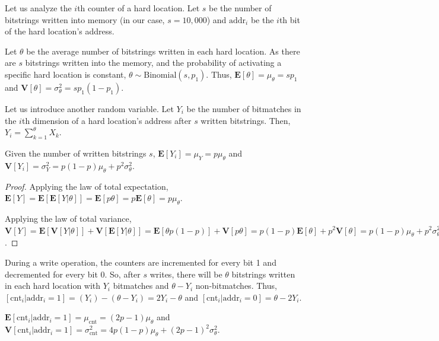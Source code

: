 Let us analyze the $i$th counter of a hard location.  Let $s$ be the number of bitstrings written into memory (in our case, $s=10,000$) and $\text{addr}_i$ be the $i$th bit of the hard location's address.

Let $\theta$ be the average number of bitstrings written in each hard location. As there are $s$ bitstrings written into the memory, and the probability of activating a specific hard location is constant, $\theta \sim \text{Binomial}(s, p_1)$. Thus, $\mathbf{E}[\theta] = \mu_\theta = s p_1$ and $\mathbf{V}[\theta] = \sigma^2_\theta = s p_1 (1 - p_1)$.

Let us introduce another random variable.  Let $Y_i$ be the number of bitmatches in the $i$th dimension of a hard location's address after $s$ written bitstrings. Then, $Y_i = \sum_{k=1}^{\theta} X_k$.

\begin{theorem}
Given the number of written bitstrings $s$, $\mathbf{E}[Y_i] = \mu_Y = p \mu_\theta$ and $\mathbf{V}[Y_i] = \sigma^2_Y = p(1-p) \mu_\theta + p^2 \sigma^2_\theta$.
\end{theorem}
\begin{proof}
Applying the law of total expectation, $\mathbf{E}[Y] = \mathbf{E}[\mathbf{E}[Y|\theta]] = \mathbf{E}[p \theta] = p \mathbf{E}[\theta] = p \mu_\theta$.

Applying the law of total variance, \\
$\mathbf{V}[Y] = \mathbf{E}[\mathbf{V}[Y|\theta]] + \mathbf{V}[\mathbf{E}[Y|\theta]] = \mathbf{E}[\theta p (1-p)] + \mathbf{V}[p \theta] = p(1-p) \mathbf{E}[\theta] + p^2 \mathbf{V}[\theta] = p(1-p) \mu_\theta + p^2 \sigma^2_\theta$.
\end{proof}

During a write operation, the counters are incremented for every bit 1 and decremented for every bit 0. So, after $s$ writes, there will be $\theta$ bitstrings written in each hard location with $Y_i$ bitmatches and $\theta - Y_i$ non-bitmatches. Thus, $[\text{cnt}_i | \text{addr}_i = 1] = (Y_i) - (\theta - Y_i) = 2Y_i - \theta$ and $[\text{cnt}_i | \text{addr}_i = 0] = \theta - 2Y_i$.

\begin{theorem}
$\mathbf{E}[\text{cnt}_i | \text{addr}_i = 1] = \mu_{\text{cnt}} = (2p-1) \mu_\theta$ and $\mathbf{V}[\text{cnt}_i | \text{addr}_i = 1] = \sigma^2_\text{cnt} = 4p(1-p) \mu_\theta + (2p-1)^2 \sigma^2_\theta$.
\end{theorem}

